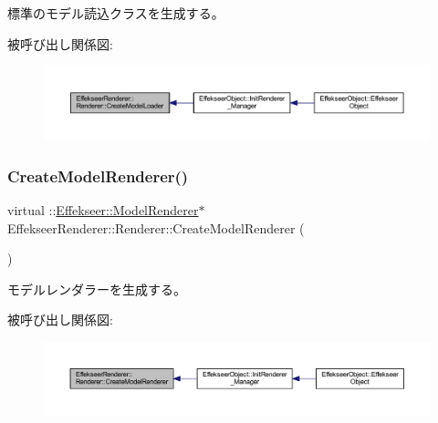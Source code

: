 標準のモデル読込クラスを生成する。 

被呼び出し関係図\+:\nopagebreak
\begin{figure}[H]
\begin{center}
\leavevmode
\includegraphics[width=350pt]{class_effekseer_renderer_1_1_renderer_ab35779830c25992af7a9a9d53423f817_icgraph}
\end{center}
\end{figure}
\mbox{\label{class_effekseer_renderer_1_1_renderer_a7cbbeb73fa35b6cf356fcef7499301fb}} 
\subsubsection{\texorpdfstring{Create\+Model\+Renderer()}{CreateModelRenderer()}}
{\footnotesize\ttfamily virtual \+::\mbox{\hyperlink{class_effekseer_1_1_model_renderer}{Effekseer\+::\+Model\+Renderer}}$\ast$ Effekseer\+Renderer\+::\+Renderer\+::\+Create\+Model\+Renderer (\begin{DoxyParamCaption}{ }\end{DoxyParamCaption})\hspace{0.3cm}{\ttfamily [pure virtual]}}



モデルレンダラーを生成する。 

被呼び出し関係図\+:\nopagebreak
\begin{figure}[H]
\begin{center}
\leavevmode
\includegraphics[width=350pt]{class_effekseer_renderer_1_1_renderer_a7cbbeb73fa35b6cf356fcef7499301fb_icgraph}
\end{center}
\end{figure}
\mbox{\label{class_effekseer_renderer_1_1_renderer_ac65157c02f8936e054c2525e4722a4f7}} 
